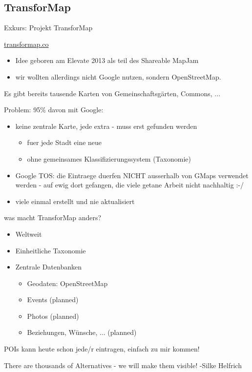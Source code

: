 \documentclass{beamer}
\begin{document}
  \subsection{ TransforMap }

\begin{frame}{Exkurs: Projekt TransforMap }

	\href{http://transformap.co}{transformap.co}

 \begin{itemize}
   \item Idee geboren am Elevate 2013 als teil des Shareable MapJam
   \item wir wollten allerdings nicht Google nutzen, sondern OpenStreetMap.
 \end{itemize}

Es gibt bereits tausende Karten von Gemeinschaftsgärten, Commons, ...

Problem: 95\% davon mit Google:
 \begin{itemize}
   \item keine zentrale Karte, jede extra - muss erst gefunden werden
	 \begin{itemize}
	   \item fuer jede Stadt eine neue
	   \item ohne gemeinsames Klassifizierungssystem (Taxonomie)
	 \end{itemize}
   \item Google TOS: die Eintraege duerfen NICHT ausserhalb von GMaps verwendet werden - auf ewig dort gefangen, die viele getane Arbeit nicht nachhaltig :-/
   \item viele einmal erstellt und nie aktualisiert
 \end{itemize}

\end{frame}

\begin{frame}{was macht TransforMap anders?}

 \begin{itemize}
   \item Weltweit
   \item Einheitliche Taxonomie
   \item Zentrale Datenbanken
	 \begin{itemize}
	   \item Geodaten: OpenStreetMap
	   \item Events (planned)
	   \item Photos (planned)
	   \item Beziehungen, Wünsche, ... (planned)
	 \end{itemize}
 \end{itemize}

POIs kann heute schon jede/r eintragen, einfach zu mir kommen!

 \pause
 There are thousands of Alternatives - we will make them visible! -Silke Helfrich

\end{frame}
\end{document}
